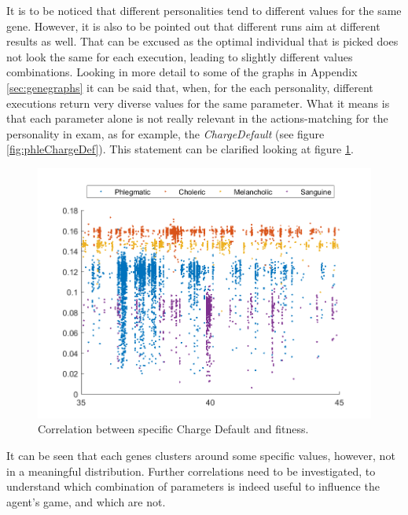 It is to be noticed that different personalities tend to different values for the same gene. However, it is also to be pointed out that different runs aim at different results as well. That can be excused as the optimal individual that is picked does not look the same for each execution, leading to slightly different values combinations. Looking in more detail to some of the graphs in Appendix \ref{sec:genegraphs} it can be said that, when, for the each personality, different executions return very diverse values for the same parameter. What it means is that each parameter alone is not really relevant in the actions-matching for the personality in exam, as for example, the \emph{ChargeDefault} (see figure \ref{fig:phleChargeDef}). This statement can be clarified looking at figure \ref{fig:chargcorrl}. 
\begin{figure}[H]
\centering
    \includegraphics[scale=0.4]{figure/indfit/chargedeffit}
  \captionsetup{justification=centering}
    \caption{Correlation between specific Charge Default and fitness.}
    \label{fig:chargcorrl}
\end{figure}
It can be seen that each genes clusters around some specific values, however, not in a meaningful distribution. Further correlations need to be investigated, to understand which combination of parameters is indeed useful to influence the agent's game, and which are not.
